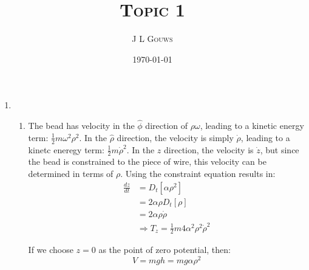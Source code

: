 \documentclass[12pt,a4]{article}
\title{
\textsc{Topic 1}
}
\author{\textsc{J L Gouws}
}
\date{\today
\\[1cm]}
\begin{document}
\thispagestyle{empty}

\maketitle

\begin{enumerate}
  \item
    \begin{enumerate}
      \item 
        The bead has velocity in the $\hat\phi$ direction of $\rho\omega$, leading to a kinetic energy term: $\frac{1}{2} m \omega^2 \rho^2$.
        In the $\hat\rho$ direction, the velocity is simply $\dot\rho$, leading to a kinetc eneregy term: $\frac{1}{2} m \dot\rho^2$.
        In the $z$ direction, the velocity is $\dot z$, but since the bead is constrained to the piece of wire, this velocity can be determined in terms of $\rho$.
        Using the constraint equation results in:
        \begin{align*}
          \frac{dz}{dt} &= D_t\left[\alpha \rho^2 \right]\\
                        &= 2 \alpha \rho D_t\left[\rho \right]\\
                        &= 2 \alpha \rho \dot\rho \\
                        &\Rightarrow T_z = \frac{1}{2} m 4 \alpha^2 \rho^2 \dot \rho^2
        \end{align*}

        If we choose $z=0$ as the point of zero potential, then:
        \begin{equation*}
          V = m g h = m g \alpha \rho^2
        \end{equation*}


\end{enumerate}
\end{enumerate}
\end{document}
